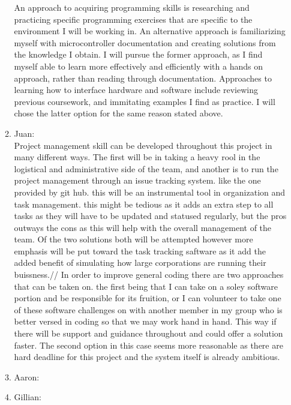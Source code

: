\documentclass[12pt]{article}
\begin{document}
\begin{enumerate}
\begin{enumerate}
    An approach to acquiring programming skills is researching and practicing specific
    programming exercises that are specific to the environment I will be working in.
    An alternative approach is familiarizing myself with microcontroller documentation and
    creating solutions from the knowledge I obtain. I will pursue the former approach, as 
    I find myself able to learn more effectively and efficiently with a hands on approach, 
    rather than reading through documentation. Approaches to learning how to interface 
    hardware and software include reviewing previous coursework, and immitating examples
    I find as practice. I will chose the latter option for the same reason stated above.\\
    \item{Juan:}\\
        Project management skill can be developed throughout this project in many different ways. The first will be in taking a heavy rool in the logistical and administrative side of the team, and another is to run the project management through an issue tracking system.
        like the one provided by git hub. this will be an instrumental tool in organization and task management. this might be tedious as it adds an extra step to all tasks as they will have to be updated and statused regularly, but the pros outways the cons 
        as this will help with the overall management of the team. Of the two solutions both will be attempted however more emphasis will be put toward the task tracking saftware as it add the added benefit of simulating how large corporations are running their buissness.//
        In order to improve general coding there are two approaches that can be taken on. the first being that I can take on a soley software portion and be responsible for its fruition, or I can volunteer to take one of these software challenges on with another member in 
        my group who is better versed in coding so that we may work hand in hand. This way if there will be support and guidance throughout and could offer a solution faster. The second option in this case seems more reasonable as there are hard deadline for this project and the system itself is already ambitious.
    \item{Aaron:}\\
    \item {Gillian:}\\
  \end{enumerate}
\end{enumerate}
\end{document}
